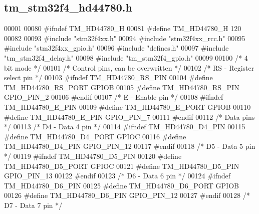 \hypertarget{tm__stm32f4__hd44780_8h_source}{}\subsection{tm\+\_\+stm32f4\+\_\+hd44780.\+h}

\begin{DoxyCode}
00001 
00080 \textcolor{preprocessor}{#ifndef TM\_HD44780\_H}
00081 \textcolor{preprocessor}{#define TM\_HD44780\_H 120}
00082 
00093 \textcolor{preprocessor}{#include "stm32f4xx.h"}
00094 \textcolor{preprocessor}{#include "stm32f4xx\_rcc.h"}
00095 \textcolor{preprocessor}{#include "stm32f4xx\_gpio.h"}
00096 \textcolor{preprocessor}{#include "defines.h"}
00097 \textcolor{preprocessor}{#include "tm\_stm32f4\_delay.h"}
00098 \textcolor{preprocessor}{#include "tm\_stm32f4\_gpio.h"}
00099 
00100 \textcolor{comment}{/* 4 bit mode */}
00101 \textcolor{comment}{/* Control pins, can be overwritten */}
00102 \textcolor{comment}{/* RS - Register select pin */}
00103 \textcolor{preprocessor}{#ifndef TM\_HD44780\_RS\_PIN}
00104 \textcolor{preprocessor}{#define TM\_HD44780\_RS\_PORT              GPIOB}
00105 \textcolor{preprocessor}{#define TM\_HD44780\_RS\_PIN               GPIO\_PIN\_2}
00106 \textcolor{preprocessor}{#endif}
00107 \textcolor{comment}{/* E - Enable pin */}
00108 \textcolor{preprocessor}{#ifndef TM\_HD44780\_E\_PIN}
00109 \textcolor{preprocessor}{#define TM\_HD44780\_E\_PORT               GPIOB}
00110 \textcolor{preprocessor}{#define TM\_HD44780\_E\_PIN                GPIO\_PIN\_7}
00111 \textcolor{preprocessor}{#endif}
00112 \textcolor{comment}{/* Data pins */}
00113 \textcolor{comment}{/* D4 - Data 4 pin */}
00114 \textcolor{preprocessor}{#ifndef TM\_HD44780\_D4\_PIN}
00115 \textcolor{preprocessor}{#define TM\_HD44780\_D4\_PORT              GPIOC}
00116 \textcolor{preprocessor}{#define TM\_HD44780\_D4\_PIN               GPIO\_PIN\_12}
00117 \textcolor{preprocessor}{#endif}
00118 \textcolor{comment}{/* D5 - Data 5 pin */}
00119 \textcolor{preprocessor}{#ifndef TM\_HD44780\_D5\_PIN}
00120 \textcolor{preprocessor}{#define TM\_HD44780\_D5\_PORT              GPIOC}
00121 \textcolor{preprocessor}{#define TM\_HD44780\_D5\_PIN               GPIO\_PIN\_13}
00122 \textcolor{preprocessor}{#endif}
00123 \textcolor{comment}{/* D6 - Data 6 pin */}
00124 \textcolor{preprocessor}{#ifndef TM\_HD44780\_D6\_PIN}
00125 \textcolor{preprocessor}{#define TM\_HD44780\_D6\_PORT              GPIOB}
00126 \textcolor{preprocessor}{#define TM\_HD44780\_D6\_PIN               GPIO\_PIN\_12}
00127 \textcolor{preprocessor}{#endif}
00128 \textcolor{comment}{/* D7 - Data 7 pin */}

\end{DoxyCode}

